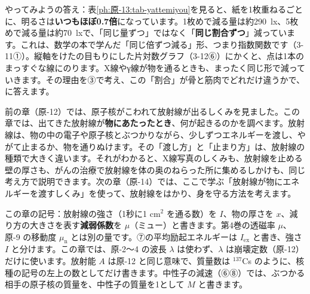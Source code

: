 \noindent やってみようの答え：表\ref{ph:原-13:tab-yattemiyou}を見ると、紙を1枚重ねるごとに、明るさは\textbf{いつもほぼ0.7倍}になっています。1枚めで減る量は約\qty{290}{lx}、5枚めで減る量は約\qty{70}{lx}で、「同じ量ずつ」ではなく「\textbf{同じ割合ずつ}」減っています。これは、数学の本で学んだ「同じ倍ずつ減る」形、つまり指数関数です（3-11①）。縦軸をけたの目もりにした片対数グラフ（3-12⑥）にかくと、点は1本のまっすぐな線にのります。X線やγ線が物を通るときも、まったく同じ形で減っていきます。その理由を③で考え、この「割合」が骨と筋肉でどれだけ違うかで、\bkhatenaref に答えます。

前の章（原-12）では、原子核がこわれて放射線が出るしくみを見ました。この章では、出てきた放射線が\textbf{物にあたったとき}、何が起きるのかを調べます。放射線は、物の中の電子や原子核とぶつかりながら、少しずつエネルギーを渡し、やがて止まるか、物を通りぬけます。その「渡し方」と「止まり方」は、放射線の種類で大きく違います。それがわかると、X線写真のしくみも、放射線を止める壁の厚さも、がんの治療で放射線を体の奥のねらった所に集めるしかけも、同じ考え方で説明できます。次の章（原-14）では、ここで学ぶ「放射線が物にエネルギーを渡すしくみ」を使って、放射線をはかり、身を守る方法を考えます。

\begin{omoidasou}
\end{omoidasou}

\noindent この章の記号：放射線の強さ（1秒に1 cm$^2$ を通る数）を $I$、物の厚さを $x$、減り方の大きさを表す\textbf{減弱係数}を $\mu$（ミュー）と書きます。第4巻の透磁率 $\mu$、原-9 の移動度 $\mu_{\mathrm n}$ とは別の量です。⑦の平均励起エネルギーは $I_{\mathrm{ex}}$ と書き、強さ $I$ と分けます。この章では、原-2〜4 の波長 $\lambda$ は使わず、$\lambda$ は崩壊定数（原-12）だけに使います。放射能 $A$ は原-12 と同じ意味で、質量数は ${}^{137}$Cs のように、核種の記号の左上の数としてだけ書きます。中性子の減速（⑥⑧）では、ぶつかる相手の原子核の質量を、中性子の質量を1として $M$ と書きます。

